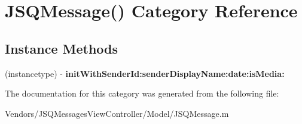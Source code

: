 \hypertarget{category_j_s_q_message_07_08}{}\section{J\+S\+Q\+Message() Category Reference}
\label{category_j_s_q_message_07_08}
\subsection*{Instance Methods}
\begin{DoxyCompactItemize}
\item 
\hypertarget{category_j_s_q_message_07_08_ab6223f8088b2bee38f44c9950f45107e}{}(instancetype) -\/ {\bfseries init\+With\+Sender\+Id\+:sender\+Display\+Name\+:date\+:is\+Media\+:}\label{category_j_s_q_message_07_08_ab6223f8088b2bee38f44c9950f45107e}

\end{DoxyCompactItemize}


The documentation for this category was generated from the following file\+:\begin{DoxyCompactItemize}
\item 
Vendors/\+J\+S\+Q\+Messages\+View\+Controller/\+Model/J\+S\+Q\+Message.\+m\end{DoxyCompactItemize}
